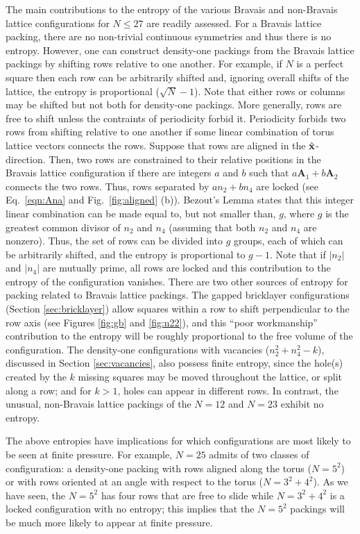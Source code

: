 \documentclass[aps]{revtex4}
\begin{document}
The main contributions to the entropy of the various Bravais and non-Bravais lattice configurations for $N \leq 27$ are readily assessed. 
 For a Bravais lattice packing, there are no non-trivial continuous symmetries and thus there is no entropy.  However, one can construct density-one packings from the Bravais lattice packings by shifting rows relative to one another.  For example, if $N$ is a perfect square then each row can be arbitrarily shifted and, ignoring overall shifts of the lattice, the entropy is proportional  ($\sqrt{N}-1$).  Note that either rows or columns may be shifted but not both for density-one packings.  More generally, rows are free to shift unless the contraints of periodicity forbid it.  Periodicity forbids two rows from shifting relative to one another if some linear combination of torus lattice vectors connects the rows.  Suppose that rows are aligned in the $\hat{\bf x}$-direction.  Then, two rows are constrained to their relative positions in the Bravais lattice configuration if there are integers $a$ and $b$ such that $a \mathbf{A}_1 + b \mathbf{A}_2$ connects the two rows. Thus, rows separated by $a n_2 + b n_4$ are locked (see Eq.\ \ref{eqn:Ana} and Fig.\  \ref{fig:aligned} (b)).
Bezout's Lemma \cite{Jones1998} states that this integer linear combination can be made equal to, but not smaller than, $g$, where $g$ is the greatest common divisor of $n_2$ and $n_4$ (assuming that both $n_2$ and $n_4$ are nonzero). Thus, the set of rows can be divided into $g$ groups, each of which can be arbitrarily shifted, and the entropy is proportional to $g-1$.
Note that if $|n_2|$ and $|n_4|$ are mutually prime, all rows are locked and this contribution to the entropy of the configuration vanishes. There are two other sources of entropy for packing related to Bravais lattice packings. The gapped bricklayer configurations (Section \ref{sec:bricklayer}) allow squares within a row to shift perpendicular to the row axis (see Figures \ref{fig:gb} and \ref{fig:n22}), and this ``poor workmanship'' contribution to the entropy will be roughly proportional to the free volume of the configuration.  The density-one configurations with vacancies ($n_2^2+n_4^2-k$), discussed in Section \ref{sec:vacancies}, also possess finite entropy, since the hole(s) created by the $k$ missing squares may be moved throughout the lattice, or split along a row; and for $k>1$, holes can appear in different rows.
In contrast, the unusual, non-Bravais lattice packings of the  $N=12$ and $N=23$ exhibit no entropy.


The above entropies have implications for which configurations are most likely to be seen at finite pressure. For example, $N=25$ admits of two classes of configuration:  a density-one packing with rows aligned along the torus ($N=5^2$) or with rows oriented at an angle with respect to the torus ($N=3^2+4^2$).  As we have seen, the $N=5^2$ has four rows that are free to slide while $N=3^2 + 4^2$ is a locked configuration with no entropy; this implies that the $N=5^2$ packings will be much more likely to appear at finite pressure.
\end{document}

